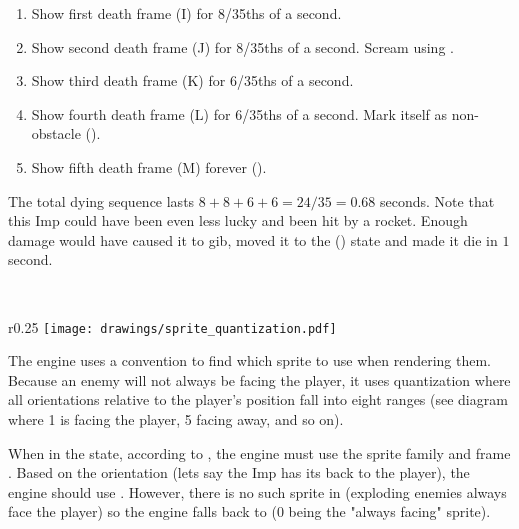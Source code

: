 \begin{enumerate}
\item Show first death frame (I) for 8/35ths of a second.
\item Show second death frame (J) for 8/35ths of a second. Scream using .
\item Show third death frame (K) for 6/35ths of a second.
\item Show fourth death frame (L) for 6/35ths of a second. Mark itself as non-obstacle ().
\item Show fifth death frame (M) forever ().
\end{enumerate}
\par
The total dying sequence lasts $8+8+6+6=24/35 = 0.68$ seconds. Note that this Imp could have been even less lucky and been hit by a rocket. Enough damage would have caused it to gib, moved it to the  () state and made it die in $1$ second.\\
\par
{}\\
\par
{}




\par
\begin{wrapfigure}[9]{r}{0.25\textwidth}
\centering
\texttt{[image: drawings/sprite\_quantization.pdf]}
\end{wrapfigure}
The engine uses a convention to find which sprite to use when rendering them. Because an enemy will not always be facing the player, it uses quantization where all orientations relative to the player's position fall into eight ranges (see diagram where 1 is facing the player, 5 facing away, and so on).\\
\par
When in the  state, according to , the engine must use the sprite family  and frame . Based on the orientation (lets say the Imp has its back to the player), the engine should use . However, there is no such sprite in  (exploding enemies always face the player) so the engine falls back to  (0 being the "always facing" sprite).
\par







